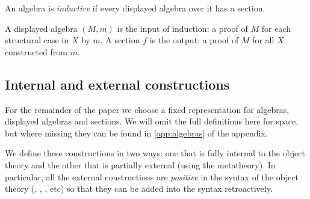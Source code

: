 \begin{definition}
An algebra is \emph{inductive} if every displayed algebra over it has a section.
\end{definition}
A displayed algebra $(M, m)$ is the input of induction: a proof of $M$ for each structural case in $X$ by $m$.
A section $f$ is the output: a proof of $M$ for all $X$ constructed from $m$.

\subsection{Internal and external constructions}

For the remainder of the paper we choose a fixed representation for algebras,
displayed algebras and sections. We will omit the full definitions here for
space, but where missing they can be found in \cref{app:algebras} of the appendix.

We define these constructions in two ways: one that is fully internal to the
object theory and the other that is partially external (using the metatheory).
In particular, all the external constructions are \emph{positive} in the
syntax of the object theory (, , , etc) so that
they can be added into the syntax retroactively.

